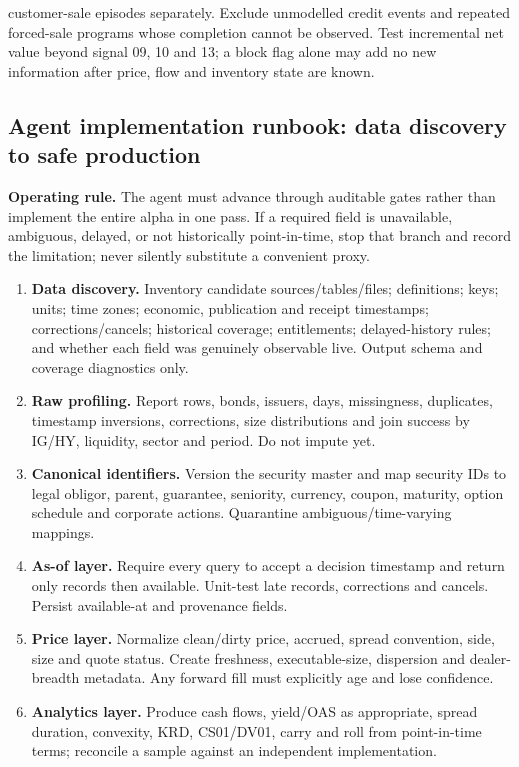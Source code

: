 \documentclass[10pt]{article}
\begin{document}
customer-sale episodes separately. Exclude unmodelled credit events and repeated forced-sale programs whose completion cannot be observed. Test incremental net value beyond signal 09, 10 and 13; a block flag alone may add no new information after price, flow and inventory state are known.
\subsection{Agent implementation runbook: data discovery to safe production}
\textbf{Operating rule.} The agent must advance through auditable gates rather than implement the entire alpha in one pass. If a required field is unavailable, ambiguous, delayed, or not historically point-in-time, stop that branch and record the limitation; never silently substitute a convenient proxy.
\begin{enumerate}[leftmargin=2em,label=\textbf{A\arabic*.}]
\item \textbf{Data discovery.} Inventory candidate sources/tables/files; definitions; keys; units; time zones; economic, publication and receipt timestamps; corrections/cancels; historical coverage; entitlements; delayed-history rules; and whether each field was genuinely observable live. Output schema and coverage diagnostics only.
\item \textbf{Raw profiling.} Report rows, bonds, issuers, days, missingness, duplicates, timestamp inversions, corrections, size distributions and join success by IG/HY, liquidity, sector and period. Do not impute yet.
\item \textbf{Canonical identifiers.} Version the security master and map security IDs to legal obligor, parent, guarantee, seniority, currency, coupon, maturity, option schedule and corporate actions. Quarantine ambiguous/time-varying mappings.
\item \textbf{As-of layer.} Require every query to accept a decision timestamp and return only records then available. Unit-test late records, corrections and cancels. Persist available-at and provenance fields.
\item \textbf{Price layer.} Normalize clean/dirty price, accrued, spread convention, side, size and quote status. Create freshness, executable-size, dispersion and dealer-breadth metadata. Any forward fill must explicitly age and lose confidence.
\item \textbf{Analytics layer.} Produce cash flows, yield/OAS as appropriate, spread duration, convexity, KRD, CS01/DV01, carry and roll from point-in-time terms; reconcile a sample against an independent implementation.

\end{enumerate}
\end{document}
